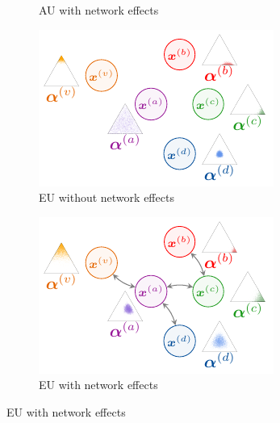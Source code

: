 \begin{figure}[!h]
\begin{subfigure}[t]{0.495\textwidth}
		\caption{AU with network effects} 
		\label{subfig:au_with_network_large}
	\end{subfigure}
	\begin{subfigure}[t]{0.495\textwidth}
	    \centering
		\includegraphics[width=\textwidth]{sections/009_neurips2021/resources/no-network-epistemic.pdf}
		\caption{EU without network effects}
		\label{subfig:eu_without_network_large}
	\end{subfigure}
	\begin{subfigure}[t]{0.495\textwidth}
	    \centering
		\includegraphics[width=\textwidth]{sections/009_neurips2021/resources/network-epistemic.pdf}
		\caption{EU with network effects}
		\label{subfig:eu_with_network_large}
	\end{subfigure}

\end{figure}
